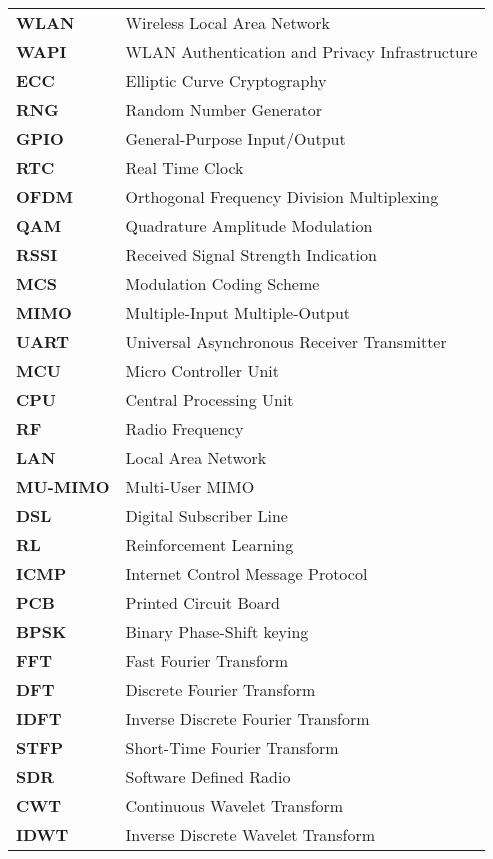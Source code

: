 \begin{appendix}
\begin{table}[H]
\begin{tabular}{ll}
\end{tabular}
\end{table}

\begin{table}[H]
\centering
\begin{tabular}{ll}
\textbf{WLAN}  &    Wireless Local Area Network   \\
\textbf{WAPI}  &    WLAN Authentication and Privacy Infrastructure   \\
\textbf{ECC}  &    Elliptic Curve Cryptography   \\
\textbf{RNG}  &     Random Number Generator   \\
\textbf{GPIO}  &    General-Purpose Input/Output   \\
\textbf{RTC}  &     Real Time Clock  \\
\textbf{OFDM}  &    Orthogonal Frequency Division Multiplexing   \\
\textbf{QAM}  &    Quadrature Amplitude Modulation   \\
\textbf{RSSI}  &     Received Signal Strength Indication  \\
\textbf{MCS}  &      Modulation Coding Scheme  \\
\textbf{MIMO}  &    Multiple-Input Multiple-Output   \\
\textbf{UART}  &    Universal Asynchronous Receiver Transmitter   \\
\textbf{MCU}  &     Micro Controller Unit  \\
\textbf{CPU}  &     Central Processing Unit  \\
\textbf{RF}  &      Radio Frequency \\
\textbf{LAN}  &    Local Area Network   \\
\textbf{MU-MIMO}  &     Multi-User MIMO  \\
\textbf{DSL}  &    Digital Subscriber Line   \\
\textbf{RL}  &      Reinforcement Learning \\
\textbf{ICMP}  &   Internet Control Message Protocol    \\
\textbf{PCB}  &     Printed Circuit Board  \\
\textbf{BPSK}  &     Binary Phase-Shift keying  \\
\textbf{FFT}  &      Fast Fourier Transform \\
\textbf{DFT}  &      Discrete Fourier Transform \\
\textbf{IDFT}  &     Inverse Discrete Fourier Transform \\
\textbf{STFP}  &     Short-Time Fourier Transform  \\
\textbf{SDR}  &      Software Defined Radio \\
\textbf{CWT}  &      Continuous Wavelet Transform \\
\textbf{IDWT}  &       Inverse Discrete Wavelet Transform\\
\end{tabular}
\end{table}



\end{appendix}
